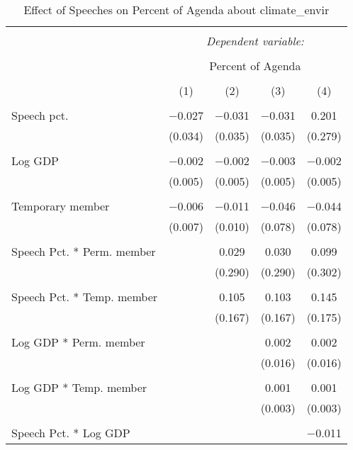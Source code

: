 
\begin{table}[!htbp] \centering 
  \caption{Effect of Speeches on Percent of Agenda about  climate_envir} 
  \label{} 
\begin{tabular}{@{\extracolsep{5pt}}lcccc} 
\\[-1.8ex]\hline 
\hline \\[-1.8ex] 
 & \multicolumn{4}{c}{\textit{Dependent variable:}} \\ 
\cline{2-5} 
\\[-1.8ex] & \multicolumn{4}{c}{Percent of Agenda} \\ 
\\[-1.8ex] & (1) & (2) & (3) & (4)\\ 
\hline \\[-1.8ex] 
 Speech pct. & $-$0.027 & $-$0.031 & $-$0.031 & 0.201 \\ 
  & (0.034) & (0.035) & (0.035) & (0.279) \\ 
  & & & & \\ 
 Log GDP & $-$0.002 & $-$0.002 & $-$0.003 & $-$0.002 \\ 
  & (0.005) & (0.005) & (0.005) & (0.005) \\ 
  & & & & \\ 
 Temporary member & $-$0.006 & $-$0.011 & $-$0.046 & $-$0.044 \\ 
  & (0.007) & (0.010) & (0.078) & (0.078) \\ 
  & & & & \\ 
 Speech Pct. * Perm. member &  & 0.029 & 0.030 & 0.099 \\ 
  &  & (0.290) & (0.290) & (0.302) \\ 
  & & & & \\ 
 Speech Pct. * Temp. member &  & 0.105 & 0.103 & 0.145 \\ 
  &  & (0.167) & (0.167) & (0.175) \\ 
  & & & & \\ 
 Log GDP * Perm. member &  &  & 0.002 & 0.002 \\ 
  &  &  & (0.016) & (0.016) \\ 
  & & & & \\ 
 Log GDP * Temp. member &  &  & 0.001 & 0.001 \\ 
  &  &  & (0.003) & (0.003) \\ 
  & & & & \\ 
 Speech Pct. * Log GDP &  &  &  & $-$0.011 \\ 

\end{tabular}
\end{table}
